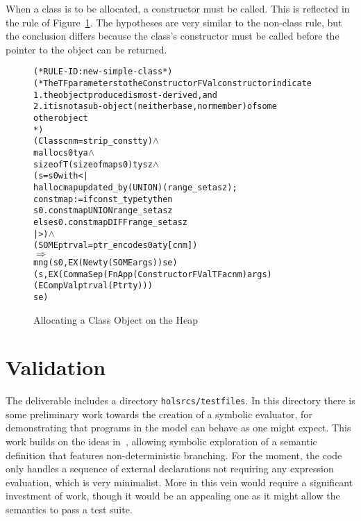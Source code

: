 \documentclass[11pt]{article}
\begin{document}
When a class is to be allocated, a constructor must be called.  This
is reflected in the rule of Figure~\ref{fig:new-simple-class}.   The
hypotheses are very similar to the non-class rule, but the conclusion
differs because the class's constructor must be called before the
pointer to the object can be returned.
\begin{figure}[htbp]
\begin{center}
\begin{minipage}{\textwidth}
\begin{alltt}
(* RULE-ID: new-simple-class *)
(* The T F parameters to the ConstructorFVal constructor indicate
    1. the object produced is most-derived, and
    2. it is not a sub-object (neither base, nor member) of some
       other object
*)
     (Class cnm = strip_const ty) \(\land\)
     malloc s0 ty a \(\land\)
     sizeof T (sizeofmap s0) ty sz \(\land\)
     (s = s0 with <|
             hallocmap updated_by (UNION) (range_set a sz) ;
             constmap := if const_type ty then
                           s0.constmap UNION range_set a sz
                         else s0.constmap DIFF range_set a sz
          |>) \(\land\)
     (SOME ptrval = ptr_encode s0 a ty [cnm])
   \(\Rightarrow\)
     mng (s0, EX (New ty (SOME args)) se)
         (s, EX (CommaSep (FnApp (ConstructorFVal T F a cnm) args)
                          (ECompVal ptrval (Ptr ty)))
                se)
\end{alltt}
\end{minipage}
\end{center}
\caption{Allocating a Class Object on the Heap}
\label{fig:new-simple-class}
\end{figure}

\section{Validation}
\label{sec:validation}

The deliverable includes a directory \texttt{holsrcs/testfiles}.  In
this directory there is some preliminary work towards the creation of
a symbolic evaluator, for demonstrating that programs in the model can
behave as one might expect.  This work builds on the ideas
in~\cite{netsem:popl2006}, allowing symbolic exploration of a semantic
definition that features non-deterministic branching.  For the moment,
the code only handles a sequence of external declarations not
requiring any expression evaluation, which is very minimalist.  More
in this vein would require a significant investment of work, though it
would be an appealing one as it might allow the semantics to pass a
test suite.
\end{document}
